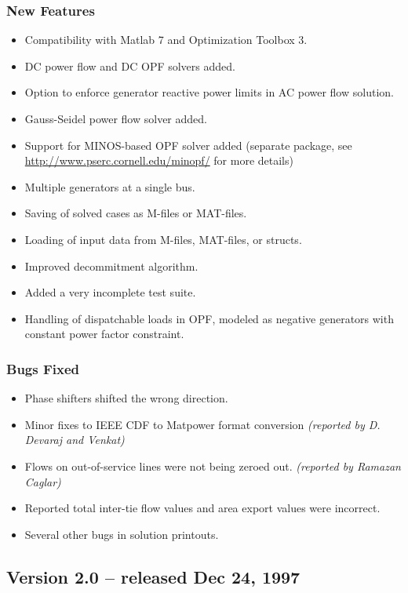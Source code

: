 \documentclass[12pt]{article}
\newcommand{\matlab}[0]{{\sc Matlab}}
\newcommand{\matpower}[0]{{\sc Matpower}}
\newcommand{\ot}[0]{{Optimization Toolbox}}
\numberwithin{equation}{section}
\numberwithin{table}{section}
\numberwithin{figure}{section}
\begin{document}
\begin{appendices}
\subsubsection*{New Features}
\begin{itemize}
\item Compatibility with \matlab{} 7 and \ot{} 3.
\item DC power flow and DC OPF solvers added.
\item Option to enforce generator reactive power limits in AC power flow solution.
\item Gauss-Seidel power flow solver added.
\item Support for MINOS-based OPF solver added (separate package, see \\ \url{http://www.pserc.cornell.edu/minopf/} for more details)
\item Multiple generators at a single bus.
\item Saving of solved cases as M-files or MAT-files.
\item Loading of input data from M-files, MAT-files, or structs.
\item Improved decommitment algorithm.
\item Added a very incomplete test suite.
\item Handling of dispatchable loads in OPF, modeled as negative generators with constant power factor constraint.
\end{itemize}

\subsubsection*{Bugs Fixed}
\begin{itemize}
\item Phase shifters shifted the wrong direction.
\item Minor fixes to IEEE CDF to \matpower{} format conversion \emph{(reported by D. Devaraj and Venkat)}
\item Flows on out-of-service lines were not being zeroed out. \emph{(reported by Ramazan Caglar)}
\item Reported total inter-tie flow values and area export values were incorrect.
\item Several other bugs in solution printouts.
\end{itemize}


\subsection{Version 2.0 -- released Dec 24, 1997}
\label{app:v20}


\end{appendices}
\end{document}
